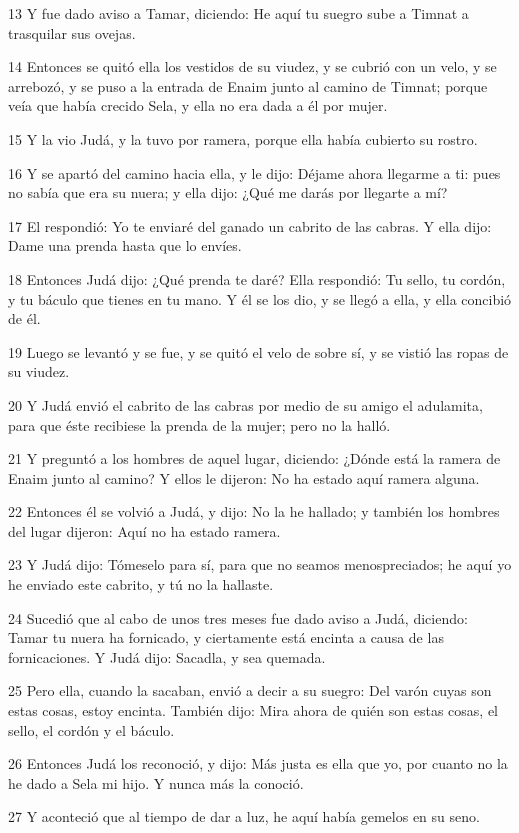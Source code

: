 13 Y fue dado aviso a Tamar, diciendo: He aquí tu suegro sube a Timnat a trasquilar sus ovejas.

14 Entonces se quitó ella los vestidos de su viudez, y se cubrió con un velo, y se arrebozó, y se puso a la entrada de Enaim junto al camino de Timnat; porque veía que había crecido Sela, y ella no era dada a él por mujer.

15 Y la vio Judá, y la tuvo por ramera, porque ella había cubierto su rostro.

16 Y se apartó del camino hacia ella, y le dijo: Déjame ahora llegarme a ti: pues no sabía que era su nuera; y ella dijo: ¿Qué me darás por llegarte a mí?

17 El respondió: Yo te enviaré del ganado un cabrito de las cabras. Y ella dijo: Dame una prenda hasta que lo envíes.

18 Entonces Judá dijo: ¿Qué prenda te daré? Ella respondió: Tu sello, tu cordón, y tu báculo que tienes en tu mano. Y él se los dio, y se llegó a ella, y ella concibió de él.

19 Luego se levantó y se fue, y se quitó el velo de sobre sí, y se vistió las ropas de su viudez.

20 Y Judá envió el cabrito de las cabras por medio de su amigo el adulamita, para que éste recibiese la prenda de la mujer; pero no la halló.

21 Y preguntó a los hombres de aquel lugar, diciendo: ¿Dónde está la ramera de Enaim junto al camino? Y ellos le dijeron: No ha estado aquí ramera alguna.

22 Entonces él se volvió a Judá, y dijo: No la he hallado; y también los hombres del lugar dijeron: Aquí no ha estado ramera.

23 Y Judá dijo: Tómeselo para sí, para que no seamos menospreciados; he aquí yo he enviado este cabrito, y tú no la hallaste.

24 Sucedió que al cabo de unos tres meses fue dado aviso a Judá, diciendo: Tamar tu nuera ha fornicado, y ciertamente está encinta a causa de las fornicaciones. Y Judá dijo: Sacadla, y sea quemada.

25 Pero ella, cuando la sacaban, envió a decir a su suegro: Del varón cuyas son estas cosas, estoy encinta. También dijo: Mira ahora de quién son estas cosas, el sello, el cordón y el báculo.

26 Entonces Judá los reconoció, y dijo: Más justa es ella que yo, por cuanto no la he dado a Sela mi hijo. Y nunca más la conoció.

27 Y aconteció que al tiempo de dar a luz, he aquí había gemelos en su seno.

